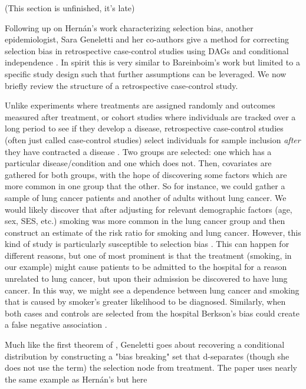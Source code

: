 \documentclass[12pt,twoside]{reedthesis}
\theoremstyle{definition}
\begin{document}
(This section is unfinished, it's late)

Following up on Hern\'an's work characterizing selection bias, another epidemiologist, Sara Geneletti and her co-authors give a method for correcting selection bias in retrospective case-control studies using DAGs and conditional independence \citep{Geneletti_2008}. In spirit this is very similar to Bareinboim's work but limited to a specific study design such that further assumptions can be leveraged.  We now briefly review the structure of a retrospective case-control study. 

Unlike experiments where treatments are assigned randomly and outcomes measured after treatment, or cohort studies where individuals are tracked over a long period to see if they develop a disease, retrospective case-control studies (often just called case-control studies) select individuals for sample inclusion \emph{after} they have contracted a disease \citep{Woodward_1999}. Two groups are selected: one which has a particular disease/condition and one which does not. Then, covariates are gathered for both groups, with the hope of discovering some factors which are more common in one group that the other. So for instance, we could gather a sample of lung cancer patients and another of adults without lung cancer. We would likely discover that after adjusting for relevant demographic factors (age, sex, SES, etc.) smoking was more common in the lung cancer group and then construct an estimate of the risk ratio for smoking and lung cancer. However, this kind of study is particularly susceptible to selection bias \citep{Woodward_1999} \citep{Geneletti_2008}. This can happen for different reasons, but one of most prominent is that the treatment (smoking, in our example) might cause patients to be admitted to the hospital for a reason unrelated to lung cancer, but upon their admission be discovered to have lung cancer. In this way, we might see a dependence between lung cancer and smoking that is caused by smoker's greater likelihood to be diagnosed.  Similarly, when both cases and controls are selected from the hospital Berkson's bias could create a false negative association \citep{Hernan_2004}.  

Much like the first theorem of \cite{Bareinboim_2014}, Geneletti goes about recovering a conditional distribution by constructing a "bias breaking" set that d-separates (though she does not use the term) the selection node from treatment. The paper uses nearly the same example as Hern\'an's but here 
\end{document}
